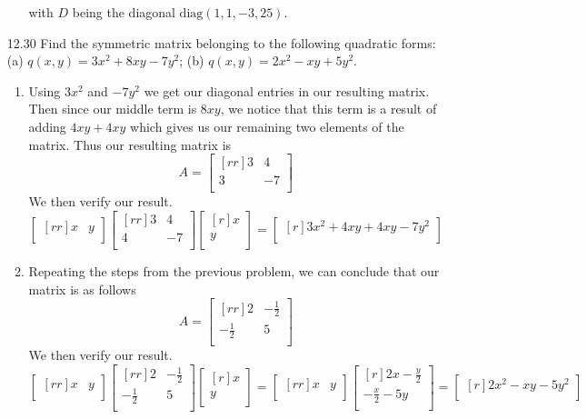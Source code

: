 \documentclass[12pt]{article}
\theoremstyle{definition}
\theoremstyle{plain}
\begin{document}
\begin{enumerate}
\begin{enumerate}
	with $D$ being the diagonal $\mathrm{diag}(1,1,-3,25)$.
	\end{enumerate}		
\item[12.30]Find the symmetric matrix belonging to the following quadratic forms: (a) $q(x,y)=3x^2+8xy-7y^2$; (b) $q(x,y)=2x^2-xy+5y^2$.
	\begin{enumerate}
	\item Using $3x^2$ and $-7y^2$ we get our diagonal entries in our resulting matrix. Then since our middle term is $8xy$, we notice that this term is a result of adding $4xy+4xy$ which gives us our remaining two elements of the matrix. Thus our resulting matrix is
	\[ A=\begin{bmatrix}[rr]3&4\\3&-7\\\end{bmatrix} \]
	We then verify our result.
	\[ \begin{bmatrix}[rr]x&y\\\end{bmatrix}\begin{bmatrix}[rr]3&4\\4&-7\\\end{bmatrix}\begin{bmatrix}[r]x\\y\\\end{bmatrix} = \begin{bmatrix}[r]3x^2+4xy+4xy-7y^2\\\end{bmatrix} \]
	\item Repeating the steps from the previous problem, we can conclude that our matrix is as follows
	\[ A=\begin{bmatrix}[rr]2&-\frac{1}{2}\\-\frac{1}{2}&5\\\end{bmatrix} \]
	We then verify our result.
	\[ \begin{bmatrix}[rr]x&y\\\end{bmatrix}\begin{bmatrix}[rr]2&-\frac{1}{2}\\-\frac{1}{2}&5\\\end{bmatrix}\begin{bmatrix}[r]x\\y\\\end{bmatrix} = \begin{bmatrix}[rr]x&y\\\end{bmatrix}\begin{bmatrix}[r]2x-\frac{y}{2}\\-\frac{x}{2}-5y\\\end{bmatrix}  = \begin{bmatrix}[r]2x^2-xy-5y^2\\\end{bmatrix}\]

\end{enumerate}
\end{enumerate}
\end{document}

